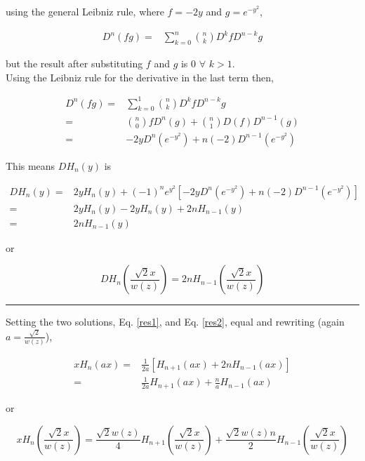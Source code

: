 \documentclass[aps,twoside,secnumarabic,balancelastpage,amsmath,amssymb,nofootinbib,hyperref=pdftex]{revtex4}
\begin{document}
using the general Leibniz rule, where $f = -2y$ and $g = e^{-y^2}$,

\begin{align*}
	D^n(fg)=&
	\sum_{k=0}^n {n \choose k} 
	D^k f
	D^{n-k} g	
\end{align*}

but the result after substituting $f$ and $g$ is $0$  $\forall$ $k>1$.\\

Using the Leibniz rule for the derivative in the last term then,


\begin{align*}
	D^n(fg)=&
	\sum_{k=0}^1 {n \choose k} 
	D^k f
	D^{n-k} g	
	\\=&
	{n \choose 0} 
	f D^{n} (g)
	+
	{n \choose 1}
	D(f) D^{n-1} (g)
		\\=&
	-2 y D^{n} (e^{-y^2})
	+
	n
	(-2) D^{n-1} (e^{-y^2})
\end{align*}

This means $D H_n(y)$ is

\begin{align*}
D H_n(y) 
	=&
	2 y H_n(y)
	+
	(-1)^n e^{y^2}
	[
		-2y  D^{n} (e^{-y^2})
	+
	n
	(-2) D^{n-1} (e^{-y^2})
	]
	\\=&
	2y H_n(y)
	-
	2y H_n(y)
	+
	2n H_{n-1}(y)
	\\=&
	2n H_{n-1} (y)
\end{align*}

or

\begin{equation}\label{res2}
D H_n(\frac{\sqrt{2}x}{w(z)}) 
	=
	2n H_{n-1} (\frac{\sqrt{2}x}{w(z)})
\end{equation}

\rule{\textwidth}{0.4pt}

Setting the two solutions, Eq. \ref{res1}, and Eq. \ref{res2}, equal and rewriting (again $a= \frac{\sqrt{2}}{w(z)}$),

\begin{align*}
x H_n(ax) =&
	\frac{1}{2a}
	[
	H_{n+1}(ax)
	+
	2n H_{n-1} (ax)
	]
	\\=&
		\frac{1}{2a}
	H_{n+1}(ax)
	+
	\frac{n}{a} H_{n-1} (ax)
\end{align*}

or

\begin{equation}
x H_n(\frac{\sqrt{2}x}{w(z)}) =
	\frac{\sqrt{2} w(z)}{4}
	H_{n+1}(\frac{\sqrt{2}x}{w(z)})
	+
	\frac{\sqrt{2} w(z) n}{2} H_{n-1} (\frac{\sqrt{2}x}{w(z)})
\end{equation}
\end{document}
